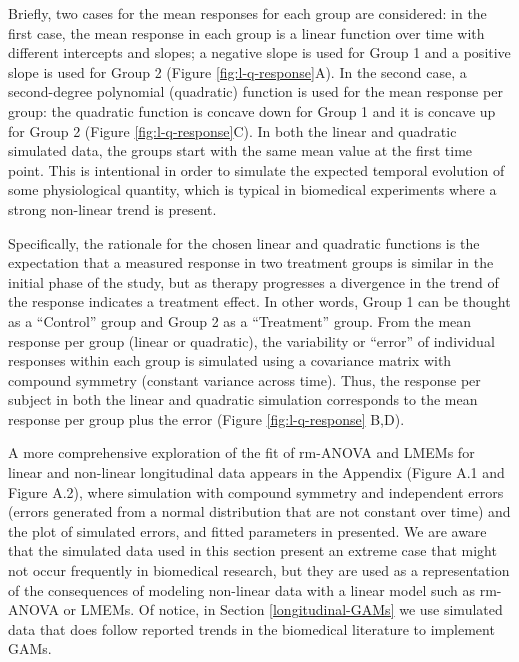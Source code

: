 \documentclass[
]{article}
\begin{document}
Briefly, two cases for the mean responses for each group are considered: in the first case, the mean response in each group is a linear function over time with different intercepts and slopes; a negative slope is used for Group 1 and a positive slope is used for Group 2 (Figure \ref{fig:l-q-response}A). In the second case, a second-degree polynomial (quadratic) function is used for the mean response per group: the quadratic function is concave down for Group 1 and it is concave up for Group 2 (Figure \ref{fig:l-q-response}C). In both the linear and quadratic simulated data, the groups start with the same mean value at the first time point. This is intentional in order to simulate the expected temporal evolution of some physiological quantity, which is typical in biomedical experiments where a strong non-linear trend is present.

Specifically, the rationale for the chosen linear and quadratic functions is the expectation that a measured response in two treatment groups is similar in the initial phase of the study, but as therapy progresses a divergence in the trend of the response indicates a treatment effect. In other words, Group 1 can be thought as a ``Control'' group and Group 2 as a ``Treatment'' group. From the mean response per group (linear or quadratic), the variability or ``error'' of individual responses within each group is simulated using a covariance matrix with compound symmetry (constant variance across time). Thus, the response per subject in both the linear and quadratic simulation corresponds to the mean response per group plus the error (Figure \ref{fig:l-q-response} B,D).

A more comprehensive exploration of the fit of rm-ANOVA and LMEMs for linear and non-linear longitudinal data appears in the Appendix (Figure A.1 and Figure A.2), where simulation with compound symmetry and independent errors (errors generated from a normal distribution that are not constant over time) and the plot of simulated errors, and fitted parameters in presented. We are aware that the simulated data used in this section present an extreme case that might not occur frequently in biomedical research, but they are used as a representation of the consequences of modeling non-linear data with a linear model such as rm-ANOVA or LMEMs. Of notice, in Section \ref{longitudinal-GAMs} we use simulated data that does follow reported trends in the biomedical literature to implement GAMs.
\end{document}
